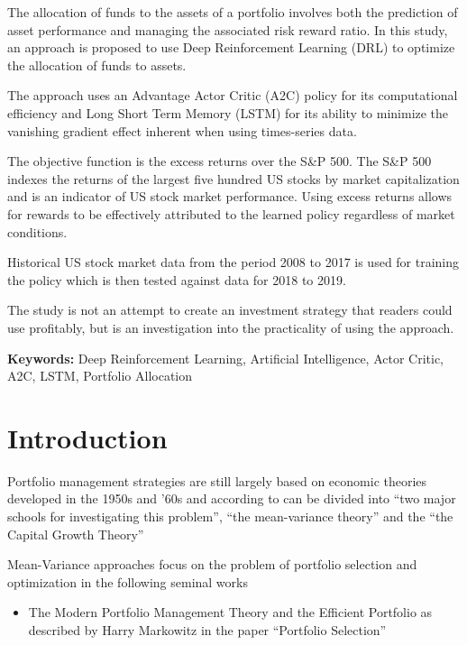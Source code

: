 \documentclass[oneside,12pt]{Classes/RoboticsLaTeX}
\begin{document}
\begin{abstracts}
The allocation of funds to the assets of a portfolio involves both the prediction of asset performance and managing the associated risk reward ratio. In this study, an approach is proposed to use Deep Reinforcement Learning (DRL) to optimize the allocation of funds to assets.

The approach uses an Advantage Actor Critic (A2C) policy for its computational efficiency and  Long Short Term Memory (LSTM) for its ability to minimize the vanishing gradient effect inherent when using times-series data.

The objective function is the excess returns over the S\&P 500. The S\&P 500 indexes the returns of the largest five hundred US stocks by market capitalization and is an indicator of US stock market performance. Using excess returns allows for rewards to be effectively attributed to  the learned policy regardless of market conditions.

Historical US stock market data from the period 2008 to 2017 is used for training the policy which is then tested against data for 2018 to 2019.

The study is not an attempt to create an investment strategy that readers could use profitably, but is an investigation into the practicality of using the approach.


\textbf{Keywords: } Deep Reinforcement Learning, Artificial Intelligence, Actor Critic, A2C, LSTM, Portfolio Allocation
\end{abstracts}


\tableofcontents
\listoffigures
\listoftables
\printglossary[title=List of Acronyms,type=\acronymtype]

\mainmatter

\chapter{Introduction}
\label{chap:introduction}
Portfolio management strategies are still largely based on economic theories developed in the 1950s and ’60s and according to \citet{LiBin2014OpsA} can be divided into “two major schools for investigating this problem”, “the mean-variance theory” and the “the Capital Growth Theory”

Mean-Variance approaches focus on the problem of portfolio selection and optimization in the following seminal works
\begin{itemize}
\item The Modern Portfolio Management Theory and the Efficient Portfolio as described by Harry Markowitz in the paper “Portfolio Selection” \citep{MarkowitzHarry1952PS}
\end{itemize}
\end{document}
